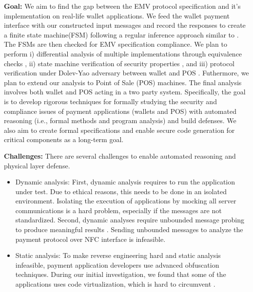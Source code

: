 \textbf{Goal: }We aim to find the gap between the EMV protocol specification and it's implementation on real-life wallet 
applications. We feed the wallet payment interface with our constructed input messages and record the responses to 
create a finite state machine(FSM) following a regular inference approach similar to \cite{formalmodels}. The FSMs are then checked for EMV specification 
compliance. We plan to perform i) differential analysis of multiple implementations through equivalence 
checks \cite{7491755}, ii) state machine verification of security properties \cite{Hussain2018LTEInspectorAS}, 
and iii) protocol verification under Dolev-Yao adversary \cite{securityofpublickey} 
between wallet and POS \cite{10.1007/978-3-642-39799-8_48}. Futhermore, we plan to extend our analysis to Point of 
Sale (POS) machines. The final analysis involves both wallet and POS acting in a two party system. 
Specifically, the goal is to develop rigorous techniques for formally studying the security and 
compliance issues of payment applications (wallets and POS) with automated reasoning (i.e., formal methods and program analysis) and build defenses. We also 
aim to create formal specifications and enable secure code generation for critical components as a long-term goal.

\textbf{Challenges: }There are several challenges to enable automated reasoning and physical layer defense.
\begin{itemize}
    \item Dynamic analysis: First, dynamic analysis requires to run the application under test. Due
    to ethical reasons, this needs to be done in an isolated environment. Isolating the execution of applications
    by mocking all server communications is a hard problem, especially if the messages are not standardized.
    Second, dynamic analyses require unbounded message probing to produce meaningful results \cite{dtlsimplement}. Sending
    unbounded messages to analyze the payment protocol over NFC interface is infeasible.
    \item Static analysis: To make reverse engineering hard and static analysis infeasible, payment
    application developers use advanced obfuscation techniques. During our initial investigation, we found that
    some of the applications uses code virtualization, which is hard to circumvent \cite{vmhunt}.

\end{itemize}

